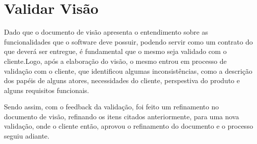 \chapter{Validar Visão}

Dado que o documento de visão apresenta o entendimento sobre as funcionalidades que o software deve possuir, podendo servir como um contrato do que deverá ser entregue, é fundamental que o mesmo seja validado com o cliente.Logo, após a elaboração do visão, o mesmo entrou em processo de validação com o cliente, que identificou algumas inconsistências, como a descrição dos papéis de alguns atores, necessidades do cliente, perspestiva do produto e alguns requisitos funcionais. 

Sendo assim, com o feedback da validação, foi feito um refinamento no documento de visão, refinando os itens citados anteriormente, para uma nova validação, onde o cliente então, aprovou o refinamento do documento e o processo seguiu adiante.
